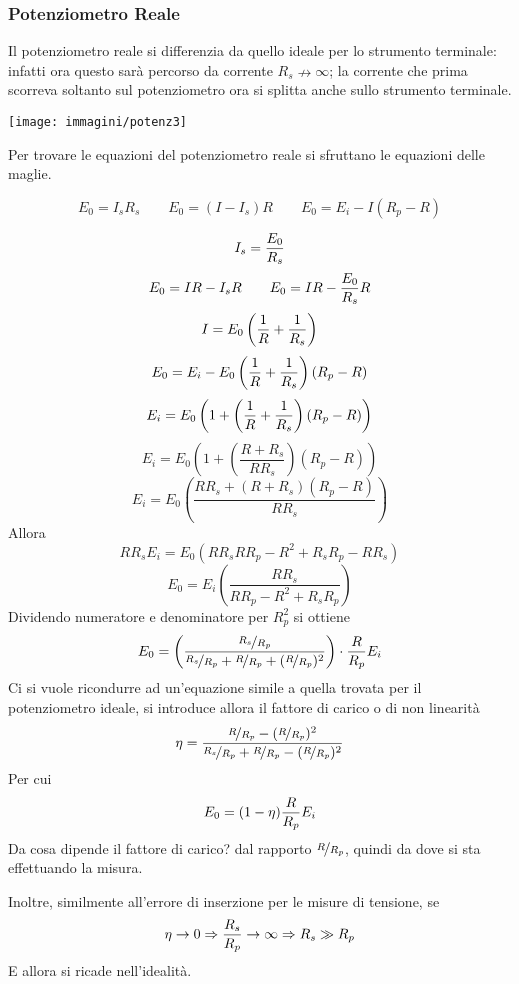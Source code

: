 \documentclass[a4paper, 15pt]{article}
\begin{document}
\subsubsection{Potenziometro Reale}
\begin{adjustwidth}{2in}{}
	Il potenziometro reale si differenzia da quello ideale per lo strumento terminale: infatti ora questo sarà percorso da corrente $R_s\nrightarrow\infty$; la corrente che prima scorreva soltanto sul potenziometro ora si splitta anche sullo strumento terminale. 
	\begin{center}
		\texttt{[image: immagini/potenz3]}
	\end{center}	
	Per trovare le equazioni del potenziometro reale si sfruttano le equazioni delle maglie. 
	
	\[E_0 = I_sR_s\qquad E_0 = (I-I_s)R \qquad E_0 = E_i - I(R_p-R)\]
	
	\[I_s = {E_0 \over R_s}\]
	\[E_0 = IR - I_sR \qquad E_0 = IR - {E_0\over R_s}R\]
	\[I = E_0\left({1\over R}+{1\over R_s}\right)\]
	\[E_0 = E_i - E_0\left({1\over R}+{1\over R_s}\right)(R_p-R)\]
	\[E_i = E_0\left(1+\left({1\over R}+{1\over R_s}\right)(R_p-R)\right)\]
	\[E_i = E_0\left(1+\left(\dfrac{R+R_s}{RR_s}\right)(R_p-R)\right)\]
	\[E_i = E_0\left(\dfrac{RR_s + (R+R_s)(R_p-R)}{RR_s}\right)\]
	Allora
	\[RR_sE_i = E_0(RR_s RR_p - R^2 + R_sR_p-RR_s)\]
	\[E_0 = E_i\left(\dfrac{RR_s}{RR_p-R^2+R_sR_p}\right)\]
	Dividendo numeratore e denominatore per $R_p^2$ si ottiene 
	\[E_0 = \left(\dfrac{\nicefrac{R_s}{R_p}}{\nicefrac{R_s}{R_p} +\nicefrac{R}{R_p} + (\nicefrac{R}{R_p})^2}\right)\cdot{R\over R_p}E_i\]
	Ci si vuole ricondurre ad un'equazione simile a quella trovata per il potenziometro ideale, si introduce allora il fattore di carico o di non linearità
	\[\eta = \dfrac{\nicefrac{R}{R_p} - (\nicefrac{R}{R_p})^2}{\nicefrac{R_s}{R_p} + \nicefrac{R}{R_p} - (\nicefrac{R}{R_p})^2 }\]
	Per cui
	\[E_0 = (1-\eta){R\over R_p}E_i\]
	Da cosa dipende il fattore di carico? dal rapporto $\nicefrac{R}{R_p}$, quindi da dove si sta effettuando la misura. 
	
	Inoltre, similmente all'errore di inserzione per le misure di tensione, se
	\[\eta\rightarrow0\Rightarrow{R_s\over R_p}\rightarrow\infty \Rightarrow R_s\gg R_p\]
	E allora si ricade nell'idealità. 
	

\end{adjustwidth}
\end{document}
